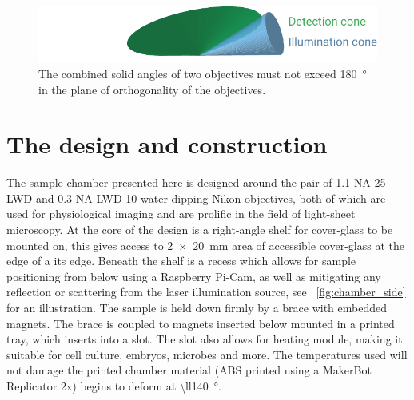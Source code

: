

\begin{figure}
    \centering
    \includegraphics{./solid_angles}
    \caption{The combined solid angles of two objectives must not exceed \SI{180}{\degree} in the plane of orthogonality of the objectives.}
    \label{fig:solid_angles}
\end{figure}

\section{The design and construction}

The sample chamber presented here is designed around the pair of 1.1 \gls{NA} \SI{25}{\times} \gls{LWD} and 0.3 \gls{NA} LWD \SI{10}{\times} water-dipping Nikon objectives, both of which are used for physiological imaging and are prolific in the field of light-sheet microscopy.
At the core of the design is a right-angle shelf for cover-glass to be mounted on, this gives access to \SI{2x20}{\milli\metre} area of accessible cover-glass at the edge of a its edge.
Beneath the shelf is a recess which allows for sample positioning from below using a Raspberry Pi-Cam, as well as mitigating any reflection or scattering from the laser illumination source, see \figurename~\ref{fig:chamber_side} for an illustration.
The sample is held down firmly by a  brace with embedded magnets.
The brace is coupled to magnets inserted below mounted in a printed tray, which inserts into a slot.
The slot also allows for heating module, making it suitable for cell culture, embryos, microbes and more.
The temperatures used will not damage the printed chamber material (\gls{ABS} printed using a MakerBot Replicator 2x) begins to deform at \SI{\ll140}{\degree}.

